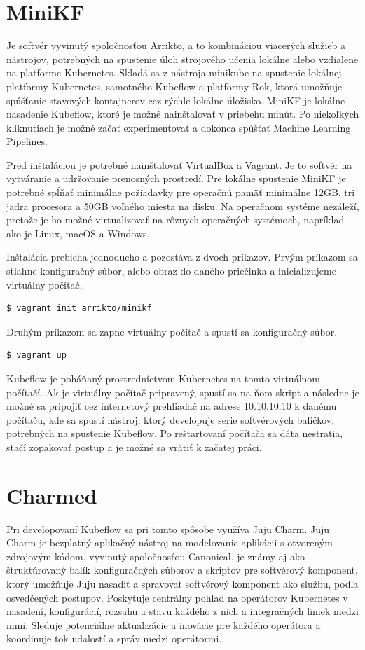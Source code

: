 \section{MiniKF}

Je softvér vyvinutý spoločnosťou Arrikto, a to kombináciou viacerých služieb a nástrojov, potrebných na spustenie úloh strojového učenia lokálne alebo vzdialene na platforme Kubernetes. Skladá sa z nástroja minikube na spustenie lokálnej platformy Kubernetes, samotného Kubeflow a platformy Rok, ktorá umožňuje spúšťanie stavových kontajnerov cez rýchle lokálne úložisko. MiniKF je lokálne nasadenie Kubeflow, ktoré je možné nainštalovať v priebehu minút. Po niekoľkých kliknutiach je možné začať experimentovať a dokonca spúšťať Machine Learning Pipelines.

Pred inštaláciou je potrebné nainštalovať VirtualBox a Vagrant. Je to softvér na vytváranie a udržovanie prenosných prostredí. Pre lokálne spustenie MiniKF je potrebné spĺňať minimálne požiadavky pre operačnú pamäť minimálne 12GB, tri jadra procesora a 50GB voľného miesta na disku. Na operačnom systéme nezáleží, pretože je ho možné virtualizovať na rôznych operačných systémoch, napríklad ako je Linux, macOS a Windows.

Inštalácia prebieha jednoducho a pozostáva z dvoch príkazov. Prvým príkazom sa stiahne konfiguračný súbor, alebo obraz do daného priečinka a inicializujeme virtuálny počítač.
\begin{lstlisting}[language=Bash]
    $ vagrant init arrikto/minikf
    \end{lstlisting}
Druhým príkazom sa zapne virtuálny počítač a spustí sa konfiguračný súbor.
\begin{lstlisting}[language=Bash]
    $ vagrant up
    \end{lstlisting}
Kubeflow je poháňaný prostredníctvom Kubernetes na tomto virtuálnom počítačí. Ak je virtuálny počítač pripravený, spustí sa na ňom skript a následne je možné sa pripojiť cez internetový prehliadač na adrese 10.10.10.10 k danému počítaču, kde sa spustí nástroj, ktorý developuje serie softvérových balíčkov, potrebných na spustenie Kubeflow. Po reštartovaní počítača sa dáta nestratia, stačí zopakovať postup a je možné sa vrátiť k začatej práci.

\section{Charmed}

Pri developovaní Kubeflow sa pri tomto spôsobe využíva Juju Charm. Juju Charm je bezplatný aplikačný nástroj na modelovanie aplikácii s otvoreným zdrojovým kódom, vyvinutý spoločnosťou Canonical, je známy aj ako štruktúrovaný balík konfiguračných súborov a skriptov pre softvérový komponent, ktorý umožňuje Juju nasadiť a spravovať softvérový komponent ako službu, podľa osvedčených postupov. Poskytuje centrálny pohľad na operátorov Kubernetes v nasadení, konfigurácií, rozsahu a stavu každého z nich a integračných liniek medzi nimi. Sleduje potenciálne aktualizácie a inovácie pre každého operátora a koordinuje tok udalostí a správ medzi operátormi.

